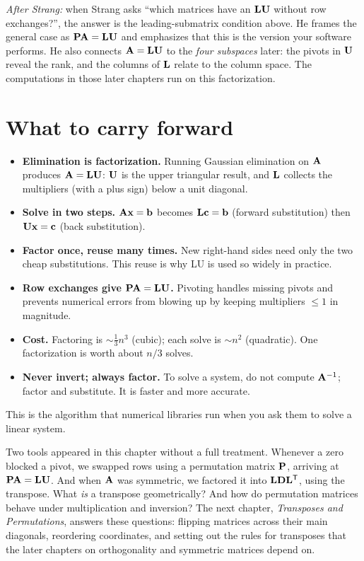 \begin{strangbox}
\emph{After Strang:} when Strang asks ``which matrices have an $\mathbf{L}\mathbf{U}$ without row
exchanges?'', the answer is the leading-submatrix condition above. He frames the general
case as $\mathbf{P}\mathbf{A}=\mathbf{L}\mathbf{U}$ and emphasizes that this is the version your software
performs. He also connects $\mathbf{A}=\mathbf{L}\mathbf{U}$ to the \emph{four subspaces} later: the
pivots in $\mathbf{U}$ reveal the rank, and the columns of $\mathbf{L}$ relate to the column space.
The computations in those later chapters run on this factorization.
\end{strangbox}

\section{What to carry forward}
\label{ch09:summary}

\begin{itemize}
  \item \textbf{Elimination is factorization.} Running Gaussian elimination on $\mathbf{A}$
        produces $\mathbf{A}=\mathbf{L}\mathbf{U}$: $\mathbf{U}$ is the upper triangular result,
        and $\mathbf{L}$ collects the multipliers (with a plus sign) below a unit diagonal.
  \item \textbf{Solve in two steps.} $\mathbf{A}\mathbf{x}=\mathbf{b}$ becomes $\mathbf{L}\mathbf{c}=\mathbf{b}$
        (forward substitution) then $\mathbf{U}\mathbf{x}=\mathbf{c}$ (back substitution).
  \item \textbf{Factor once, reuse many times.} New right-hand sides need only the two cheap
        substitutions. This reuse is why LU is used so widely in practice.
  \item \textbf{Row exchanges give $\mathbf{P}\mathbf{A}=\mathbf{L}\mathbf{U}$.} Pivoting handles missing
        pivots and prevents numerical errors from blowing up by keeping multipliers
        $\le 1$ in magnitude.
  \item \textbf{Cost.} Factoring is $\sim\tfrac13 n^3$ (cubic); each solve is $\sim n^2$
        (quadratic). One factorization is worth about $n/3$ solves.
  \item \textbf{Never invert; always factor.} To solve a system, do not compute $\mathbf{A}^{-1}$;
        factor and substitute. It is faster and more accurate.
\end{itemize}

This is the algorithm that numerical libraries run when you ask them to solve a linear
system.

Two tools appeared in this chapter without a full treatment. Whenever a zero blocked a pivot,
we swapped rows using a permutation matrix $\mathbf{P}$, arriving at
$\mathbf{P}\mathbf{A}=\mathbf{L}\mathbf{U}$. And when $\mathbf{A}$ was symmetric, we factored it into
$\mathbf{L}\mathbf{D}\mathbf{L}^{\mathsf{T}}$, using the transpose. What \emph{is} a transpose geometrically? And
how do permutation matrices behave under multiplication and inversion? The next chapter,
\emph{Transposes and Permutations}, answers these questions: flipping matrices across their
main diagonals, reordering coordinates, and setting out the rules for transposes that the
later chapters on orthogonality and symmetric matrices depend on.

